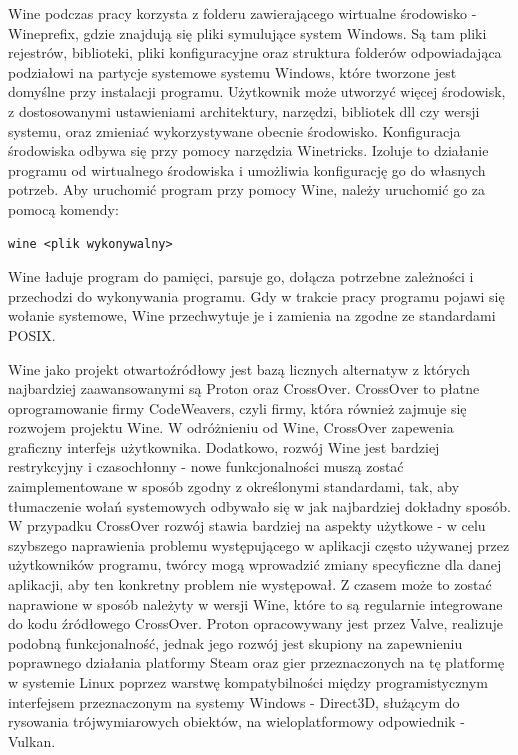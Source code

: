 Wine podczas pracy korzysta z folderu zawierającego wirtualne środowisko - Wineprefix\cite{wineprefix}, gdzie znajdują się pliki symulujące system Windows. Są tam pliki rejestrów, biblioteki, pliki konfiguracyjne oraz struktura folderów odpowiadająca podziałowi na partycje systemowe systemu Windows, które tworzone jest domyślne przy instalacji programu. Użytkownik może utworzyć więcej środowisk, z dostosowanymi ustawieniami architektury, narzędzi, bibliotek dll czy wersji systemu, oraz zmieniać wykorzystywane obecnie środowisko. Konfiguracja środowiska odbywa się przy pomocy narzędzia Winetricks\cite{winetricks}. Izoluje to działanie programu od wirtualnego środowiska i umożliwia konfigurację go do własnych potrzeb. Aby uruchomić program przy pomocy Wine, należy uruchomić go za pomocą komendy:
\begin{verbatim}
wine <plik wykonywalny>
\end{verbatim} Wine ładuje program do pamięci, parsuje go, dołącza potrzebne zależności i przechodzi do wykonywania programu. Gdy w trakcie pracy programu pojawi się wołanie systemowe, Wine przechwytuje je i zamienia na zgodne ze standardami POSIX. 


Wine jako projekt otwartoźródłowy jest bazą licznych alternatyw\cite{wineBasedProjects} z których najbardziej zaawansowanymi są Proton\cite{proton} oraz CrossOver\cite{crossover}. CrossOver to płatne oprogramowanie firmy CodeWeavers, czyli firmy, która również zajmuje się rozwojem projektu Wine. W odróżnieniu od Wine, CrossOver zapewenia graficzny interfejs użytkownika. Dodatkowo, rozwój Wine jest bardziej restrykcyjny i czasochłonny - nowe funkcjonalności muszą zostać zaimplementowane w sposób zgodny z określonymi standardami, tak, aby tłumaczenie wołań systemowych odbywało się w jak najbardziej dokładny sposób. W przypadku CrossOver rozwój stawia bardziej na aspekty użytkowe - w celu szybszego naprawienia problemu występującego w aplikacji często używanej przez użytkowników programu, twórcy mogą wprowadzić zmiany specyficzne dla danej aplikacji, aby ten konkretny problem nie występował. Z czasem może to zostać naprawione w sposób należyty w wersji Wine, które to są regularnie integrowane do kodu źródłowego CrossOver. Proton opracowywany jest przez Valve, realizuje podobną funkcjonalność, jednak jego rozwój jest skupiony na zapewnieniu poprawnego działania platformy Steam oraz gier przeznaczonych na tę platformę w systemie Linux poprzez warstwę kompatybilności między programistycznym interfejsem przeznaczonym na systemy Windows - Direct3D, służącym do rysowania trójwymiarowych obiektów, na wieloplatformowy odpowiednik - Vulkan.

